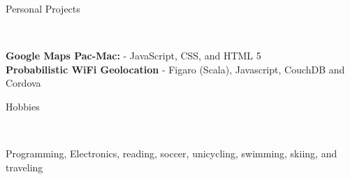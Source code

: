 \documentclass[9pt]{article}
\newenvironment{changemargin}[2]{%
  \begin{list}{}{%
    \setlength{\topsep}{0pt}%
    \setlength{\leftmargin}{#1}%
    \setlength{\rightmargin}{#2}%
    \setlength{\listparindent}{\parindent}%
    \setlength{\itemindent}{\parindent}%
    \setlength{\parsep}{\parskip}%
  }%
  \item[]}{\end{list}
}
\newcommand{\lineover}{
    \begin{changemargin}{-0.05in}{-0.05in}
        \vspace*{-8pt}
        \hrulefill \\
        \vspace*{-2pt}
    \end{changemargin}
}
\newcommand{\header}[1]{
    \begin{changemargin}{-0.5in}{-0.5in}
        {\large #1}\\
        \lineover
    \end{changemargin}
}
\newenvironment{body} {
    \vspace*{-16pt}
    \begin{changemargin}{-0.20in}{-0.5in}
  }
    {\end{changemargin}
}
\begin{document}

\header{Personal Projects}

\begin{body}
    \vspace{14pt}

    \textbf{Google Maps Pac-Mac:} - JavaScript, CSS, and HTML 5\\
    \medskip
    \textbf{Probabilistic WiFi Geolocation} - Figaro (Scala), Javascript, CouchDB and Cordova

\end{body}
\smallskip


\header{Hobbies}

\begin{body}
    \vspace{14pt}
    Programming, Electronics, reading, soccer, unicycling, swimming, skiing, and traveling
\end{body}
\end{document}
